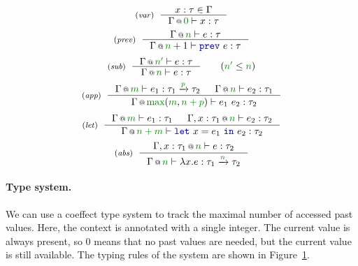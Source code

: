 \begin{figure}[t]
\begin{equation*}
\tyrule{var}
  {x : \tau \in \Gamma}
  {\coctx{\Gamma}{\cclrd{ 0 }} \vdash x : \tau }
\end{equation*}
\begin{equation*}
\tyrule{prev}
  {\coctx{\Gamma}{ \cclrd{n} } \vdash e : \tau}
  {\coctx{\Gamma}{ \cclrd{n}+1} \vdash \kvd{prev}~e : \tau}
\end{equation*}
\begin{equation*}
\tyrule{sub}
  {\coctx{\Gamma}{\cclrd{n'}} \vdash e : \tau }
  {\coctx{\Gamma}{\cclrd{n}} \vdash e : \tau }\quad\quad(\cclrd{n'} \leq \cclrd{n})
\end{equation*}
\begin{equation*}
\tyrule{app}
  {\coctx{\Gamma}{\cclrd{m}} \vdash e_1 : \tau_1 \xrightarrow{\cclrd{p}} \tau_2 &
   \coctx{\Gamma}{\cclrd{n}} \vdash e_2 : \tau_1 }
  {\coctx{\Gamma}{\cclrd{\textnormal{max}}(\cclrd{m}, \cclrd{n+p})} \vdash e_1~e_2 : \tau_2}
\end{equation*}
\begin{equation*}
\tyrule{let}
  { \coctx{\Gamma}{\cclrd{m}} \vdash e_1 : \tau_1 &
    \coctx{\Gamma, x:\tau_1}{\cclrd{n}} \vdash e_2 : \tau_2}
  {\coctx{\Gamma}{\cclrd{n+m}} \vdash \kvd{let}~x=e_1~\kvd{in}~e_2 : \tau_2 }
\end{equation*}
\begin{equation*}
\tyrule{abs}
  {\coctx{\Gamma, x:\tau_1}{\cclrd{n}} \vdash e : \tau_2}
  {\coctx{\Gamma}{\cclrd{n}} \vdash \lambda x.e : \tau_1 \xrightarrow{\cclrd{n}} \tau_2 }
\end{equation*}

\label{fig:applications-flat-dataflow}
\end{figure}


\paragraph{Type system.}
We can use a coeffect type system to track the maximal number of accessed past values. Here,
the context is annotated with a single integer. The current value is always present, so $0$ means
that no past values are needed, but the current value is still available. The typing rules of
the system are shown in Figure~\ref{fig:applications-flat-dataflow}.

